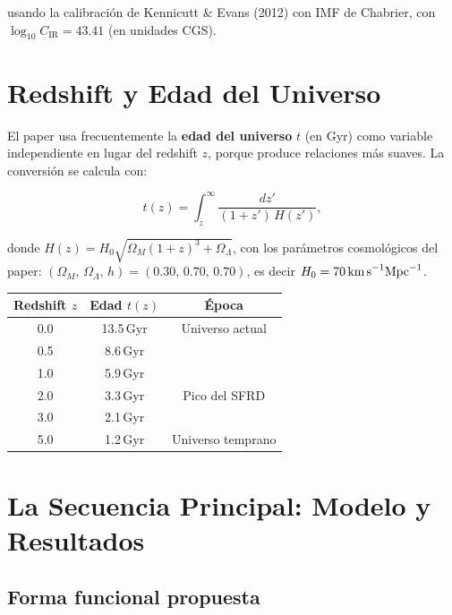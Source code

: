 \documentclass[12pt, a4paper]{article}
\begin{document}
usando la calibración de Kennicutt \& Evans (2012) con IMF de Chabrier,
con $\log_{10} C_{\text{IR}} = 43.41$ (en unidades CGS).

\section{Redshift y Edad del Universo}

El paper usa frecuentemente la \textbf{edad del universo} $t$ (en Gyr) como
variable independiente en lugar del redshift $z$, porque produce relaciones
más suaves. La conversión se calcula con:

\begin{equation}
    t(z) = \int_z^{\infty} \frac{dz'}{(1+z')\,H(z')},
    \label{eq:cosmo}
\end{equation}

donde $H(z) = H_0\sqrt{\Omega_M(1+z)^3 + \Omega_\Lambda}$,
con los parámetros cosmológicos del paper:
$(\Omega_M,\,\Omega_\Lambda,\,h) = (0.30,\,0.70,\,0.70)$,
es decir $H_0 = 70\,\text{km\,s}^{-1}\text{Mpc}^{-1}$.

\begin{center}
\begin{tabular}{ccc}
\toprule
\textbf{Redshift} $z$ & \textbf{Edad} $t(z)$ & \textbf{Época} \\
\midrule
0.0 & 13.5\,Gyr & Universo actual \\
0.5 & 8.6\,Gyr  & \\
1.0 & 5.9\,Gyr  & \\
2.0 & 3.3\,Gyr  & Pico del SFRD \\
3.0 & 2.1\,Gyr  & \\
5.0 & 1.2\,Gyr  & Universo temprano \\
\bottomrule
\end{tabular}
\end{center}

\section{La Secuencia Principal: Modelo y Resultados}

\subsection{Forma funcional propuesta}
\end{document}
